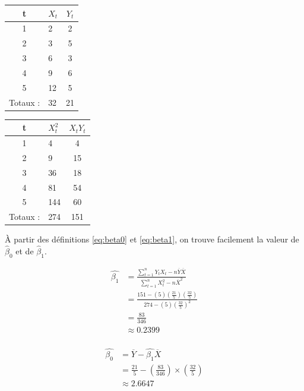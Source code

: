 \documentclass[11pt,french]{report}
\begin{document}
\begin{minipage}[t]{.4\linewidth}
\begin{tabular}{|c|b|c|}
\hline
\rowcolor{codegray}
t & $X_t$ & $Y_t$ \\
\hline
1 & 2 & 2 \\
2 & 3 & 5 \\
3 & 6 & 3 \\
4 & 9 & 6 \\
5 & 12 & 5 \\
\hline
\rowcolor{codegray}
Totaux : & 32 & 21 \\
\hline
\end{tabular}
\end{minipage}
\hfill
\begin{minipage}[t]{.4\linewidth}
\begin{tabular}{|c|b|c|}
\hline
\rowcolor{codegray}
t & $X_t^2$ & $X_tY_t$ \\
\hline
1 & 4 & 4 \\
2 & 9 & 15 \\
3 & 36 & 18 \\
4 & 81 & 54 \\
5 & 144 & 60 \\
\hline
\rowcolor{codegray}
Totaux : & 274 & 151 \\
\hline
\end{tabular}
\end{minipage}

\bigskip
À partir des définitions \ref{eq:beta0} et  \ref{eq:beta1}, on trouve facilement la valeur de $\hat{\beta}_0$ et de $\hat{\beta}_1$.

\begin{align*}
\hat{\beta_1} &= \frac{\displaystyle\sum_{t=1}^n Y_t X_t - n\overline{Y}\overline{X}}{\displaystyle\sum_{t=1}^n X_t^2 - n\overline{X}^2} \\
&= \frac{151 - (5)(\frac{21}{5})(\frac{32}{5})}{274 - (5)(\frac{32}{5})^2} \\
&= \frac{83}{346} \\
& \approx 0.2399 \\
\end{align*}

\begin{align*}
\hat{\beta_0} &= \overline{Y} - \hat{\beta_1} \overline{X} \\
&= \frac{21}{5} - (\frac{83}{346}) \times (\frac{32}{5}) \\
& \approx 2.6647
\end{align*}
\end{document}
